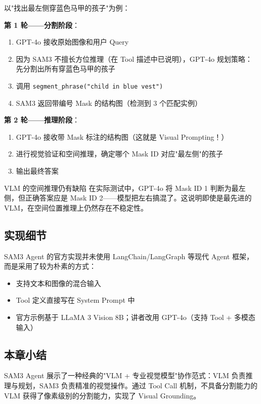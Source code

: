 以"找出最左侧穿蓝色马甲的孩子"为例：

\textbf{第 1 轮——分割阶段}：
\begin{enumerate}
    \item GPT-4o 接收原始图像和用户 Query
    \item 因为 SAM3 不擅长方位推理（在 Tool 描述中已说明），GPT-4o 规划策略：先分割出所有穿蓝色马甲的孩子
    \item 调用 \texttt{segment\_phrase("child in blue vest")}
    \item SAM3 返回带编号 Mask 的结构图（检测到 3 个匹配实例）
\end{enumerate}

\textbf{第 2 轮——推理阶段}：
\begin{enumerate}
    \item GPT-4o 接收带 Mask 标注的结构图（这就是 Visual Prompting！）
    \item 进行视觉验证和空间推理，确定哪个 Mask ID 对应"最左侧"的孩子
    \item 输出最终答案
\end{enumerate}

\begin{warningbox}{VLM 的空间推理仍有缺陷}
在实际测试中，GPT-4o 将 Mask ID 1 判断为最左侧，但正确答案应是 Mask ID 2——模型把左右搞混了。这说明即使是最先进的 VLM，在空间位置推理上仍然存在不稳定性。
\end{warningbox}

\subsection{实现细节}

SAM3 Agent 的官方实现并未使用 LangChain/LangGraph 等现代 Agent 框架，而是采用了较为朴素的方式：

\begin{itemize}
    \item 支持文本和图像的混合输入
    \item Tool 定义直接写在 System Prompt 中
    \item 官方示例基于 LLaMA 3 Vision 8B；讲者改用 GPT-4o（支持 Tool + 多模态输入）
\end{itemize}

\subsection{本章小结}

SAM3 Agent 展示了一种经典的"VLM + 专业视觉模型"协作范式：VLM 负责推理与规划，SAM3 负责精准的视觉操作。通过 Tool Call 机制，不具备分割能力的 VLM 获得了像素级别的分割能力，实现了 Visual Grounding。


